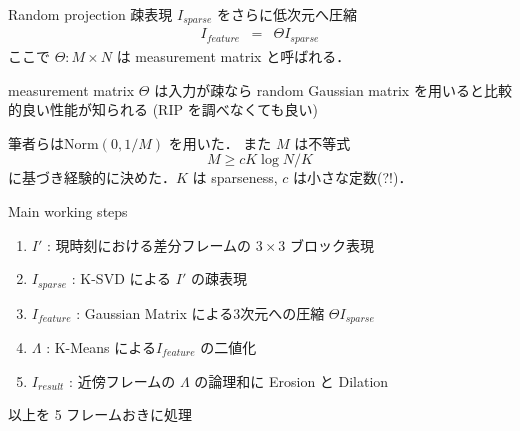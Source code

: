 \begin{frame}{Random projection}
疎表現 $I_{sparse}$ をさらに低次元へ圧縮
\begin{eqnarray}
    I_{feature} & = & \Theta I_{sparse}
\end{eqnarray}
ここで $\Theta : M \times N$ は measurement matrix と呼ばれる．
\begin{block}{measurement matrix}
$\Theta$ は入力が疎なら random Gaussian matrix を用いると比較的良い性能が知られる (RIP を調べなくても良い)\cite{Candes2006}
\end{block}
筆者らは$\mathrm{Norm}(0, 1/M)$ を用いた．
また $M$ は不等式
\begin{equation}
    M \geq c K \log{N/K}
\end{equation}
に基づき経験的に決めた．$K$ は sparseness, $c$ は小さな定数(?!)．
\end{frame}


\begin{frame}{Main working steps}
\begin{enumerate}
    \item $I'$ : 現時刻における差分フレームの $3\times3$ ブロック表現
    \item $I_{sparse}$ : K-SVD による $I'$ の疎表現
    \item $I_{feature}$ : Gaussian Matrix による3次元への圧縮 $\Theta I_{sparse}$
    \item $\Lambda$ : K-Means による$I_{feature}$ の二値化
    \item $I_{result}$ : 近傍フレームの $\Lambda$ の論理和に Erosion と Dilation
\end{enumerate}
以上を 5 フレームおきに処理
\end{frame}
